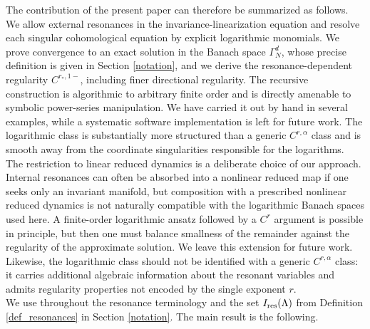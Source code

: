 \documentclass{amsart}
\theoremstyle{plain}
\theoremstyle{definition}
\begin{document}
The contribution of the present paper can therefore be summarized as follows. We allow external resonances in the invariance-linearization equation and resolve each singular cohomological equation by explicit logarithmic monomials. We prove convergence to an exact solution in the Banach space $\Gamma_N^d$, whose precise definition is given in Section \ref{notation}, and we derive the resonance-dependent regularity $C^{r_*,1-}$, including finer directional regularity. The recursive construction is algorithmic to arbitrary finite order and is directly amenable to symbolic power-series manipulation. We have carried it out by hand in several examples, while a systematic software implementation is left for future work. The logarithmic class is substantially more structured than a generic $C^{r,\alpha}$ class and is smooth away from the coordinate singularities responsible for the logarithms.\\
The restriction to linear reduced dynamics is a deliberate choice of our approach. Internal resonances can often be absorbed into a nonlinear reduced map if one seeks only an invariant manifold, but composition with a prescribed nonlinear reduced dynamics is not naturally compatible with the logarithmic Banach spaces used here. A finite-order logarithmic ansatz followed by a $C^r$ argument is possible in principle, but then one must balance smallness of the remainder against the regularity of the approximate solution. We leave this extension for future work. Likewise, the logarithmic class should not be identified with a generic $C^{r,\alpha}$ class: it carries additional algebraic information about the resonant variables and admits regularity properties not encoded by the single exponent $r$.\\

We use throughout the resonance terminology and the set $I_{\rm res}(\Lambda)$ from Definition \ref{def_resonances} in Section \ref{notation}. The main result is the following.
\end{document}
